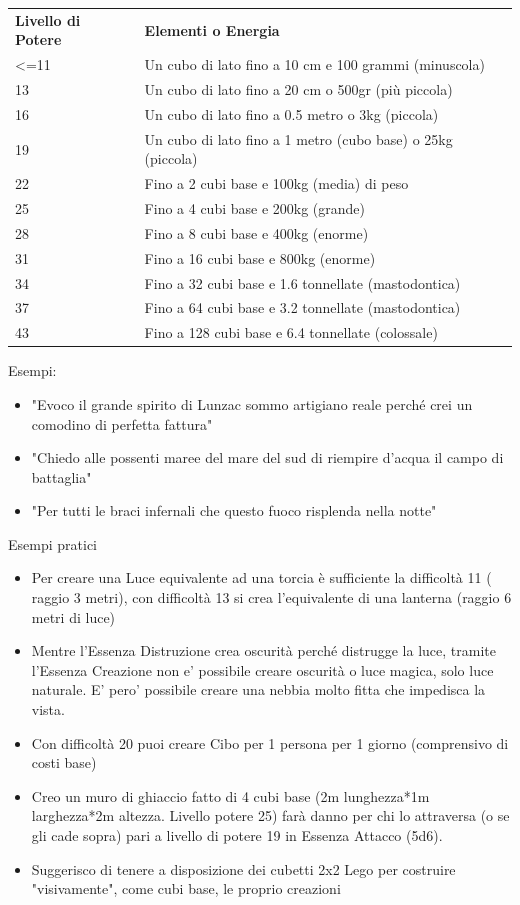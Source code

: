 \documentclass[a4paper,11pt,twoside,openany]{book}
\begin{document}
\begin{tabularx}{0.95\textwidth}{lX}
	\toprule
	\textbf{Livello di Potere} & \textbf{Elementi o Energia}\\
	\textless=11     & Un cubo di lato fino a 10 cm e 100 grammi (minuscola)\\
	13               & Un cubo di lato fino a 20 cm o 500gr (più piccola)\\
	16               & Un cubo di lato fino a 0.5 metro o 3kg (piccola)\\
	19               & Un cubo di lato fino a 1 metro (cubo base) o 25kg (piccola)\\
	22               & Fino a 2 cubi base e 100kg (media) di peso\\
	25               & Fino a 4 cubi base e 200kg (grande)\\
	28               & Fino a 8 cubi base e 400kg (enorme)\\
	31               & Fino a 16 cubi base e 800kg (enorme)\\
	34               & Fino a 32 cubi base e 1.6 tonnellate (mastodontica)\\
	37               & Fino a 64 cubi base e 3.2 tonnellate (mastodontica)\\
	43               & Fino a 128 cubi base e 6.4 tonnellate (colossale)\\
\end{tabularx}

\bigskip

Esempi:
\begin{itemize}
	\item "Evoco il grande spirito di Lunzac sommo artigiano reale perché crei un comodino di perfetta fattura"
	\item "Chiedo alle possenti maree del mare del sud di riempire d'acqua il campo di battaglia"
	\item "Per tutti le braci infernali che questo fuoco risplenda nella notte"
\end{itemize}

\bigskip

Esempi pratici
\begin{itemize}
	\item Per creare una Luce equivalente ad una torcia è sufficiente la difficoltà 11 ( raggio 3 metri), con difficoltà 13 si crea l'equivalente di una lanterna (raggio 6 metri di luce)
	\item Mentre l'Essenza Distruzione crea oscurità perché distrugge la luce, tramite l'Essenza Creazione non e' possibile creare oscurità o luce magica, solo luce naturale. E' pero' possibile creare una nebbia molto fitta che impedisca la vista.
	\item Con difficoltà 20 puoi creare Cibo per 1 persona per 1 giorno (comprensivo di costi base)
	\item Creo un muro di ghiaccio fatto di 4 cubi base (2m lunghezza{*}1m larghezza{*}2m altezza. Livello potere 25) farà danno per chi lo attraversa (o se gli cade sopra) pari a livello di potere 19 in Essenza Attacco (5d6).
	\item Suggerisco di tenere a disposizione dei cubetti 2x2 Lego per costruire "visivamente", come cubi base, le proprio creazioni
\end{itemize}
\end{document}

